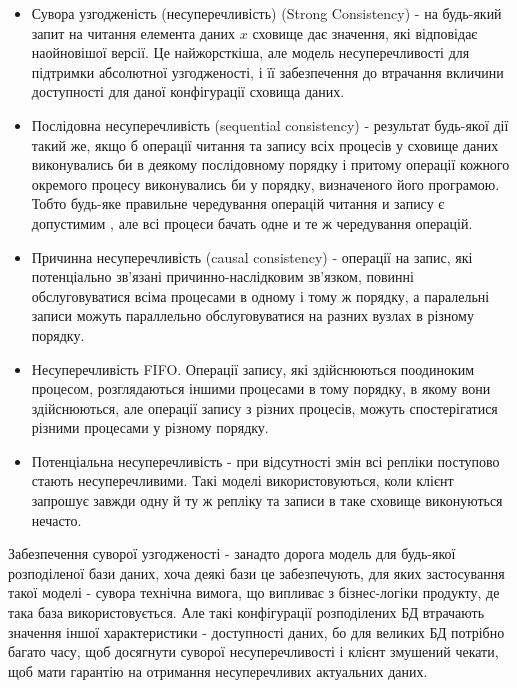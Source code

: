 \documentclass[14pt]{vakthesis}
\begin{document}
\begin{itemize}
\item Сувора узгодженість (несуперечливість) (Strong Consistency) - на будь-який запит на читання елемента даних $x$ сховище дає значення, які відповідає наойновішої версії. Це найжорсткіша, але модель несуперечливості для підтримки абсолютної узгодженості, і її забезпечення до втрачання вкличини доступності для даної конфігурації сховища даних.

\item Послідовна несуперечливість (sequential consistency) - результат будь-якої дії такий же, якщо б операції читання та запису всіх процесів у сховище даних виконувались би в деякому послідовному порядку і притому операції кожного окремого процесу виконувались би у порядку, визначеного його програмою. Тобто будь-яке правильне чередування операцій читання и запису є допустимим , але всі процеси бачать одне и те ж чередування операцій.

\item Причинна несуперечливість (causal consistency) - операції на запис, які потенціально зв'язані причинно-наслідковим зв'язком, повинні  обслуговуватися всіма процесами в одному і тому ж порядку, а паралельні записи можуть параллельно обслуговуватися на разних вузлах в різному порядку.

\item Несуперечливість FIFO. Операції запису, які здійснюються поодиноким процесом, розглядаються іншими процесами в тому порядку, в якому вони здійснюються, але операції запису з різних процесів, можуть спостерігатися різними процесами у різному порядку.

\item Потенціальна несуперечливість - при відсутності змін всі репліки поступово стають несуперечливими. Такі моделі використовуються, коли клієнт запрошує завжди одну й ту ж репліку та записи в таке сховище виконуються нечасто.

\end{itemize}

Забезпечення суворої узгодженості - занадто дорога модель для будь-якої розподіленої бази даних, хоча деякі бази це забезпечують, для яких застосування такої моделі - сувора технічна вимога, що випливає з бізнес-логіки продукту, де така база використовується.
Але такі конфігурації розподілених БД втрачають значення іншої характеристики - доступності даних, бо для великих БД потрібно багато часу, щоб досягнути суворої несуперечливості і клієнт змушений чекати, щоб мати гарантію на отримання несуперечливих актуальних даних.
\end{document}
